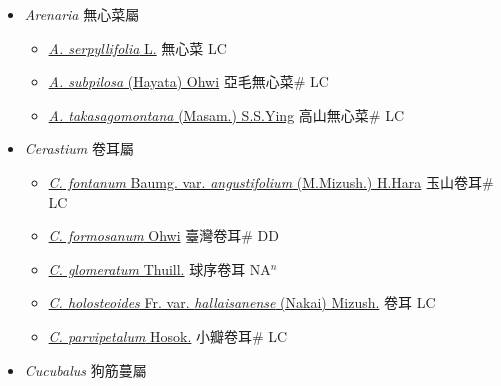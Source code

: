 
  \begin{itemize}
 \item[] \textit{Arenaria} 無心菜屬
                    
  \begin{itemize}
        \item[] \href{http://www.theplantlist.org/tpl1.1/search?q=Arenaria+serpyllifolia}{\textit{A. serpyllifolia} L.}   無心菜 LC
        \item[] \href{http://www.theplantlist.org/tpl1.1/search?q=Arenaria+subpilosa}{\textit{A. subpilosa} (Hayata) Ohwi}   亞毛無心菜\# LC
        \item[] \href{http://www.theplantlist.org/tpl1.1/search?q=Arenaria+takasagomontana}{\textit{A. takasagomontana} (Masam.) S.S.Ying}   高山無心菜\# LC
  \end{itemize}
 \item[] \textit{Cerastium} 卷耳屬
                    
  \begin{itemize}
        \item[] \href{http://www.theplantlist.org/tpl1.1/search?q=Cerastium+fontanum+var.+angustifolium}{\textit{C. fontanum} Baumg. var. \textit{angustifolium} (M.Mizush.) H.Hara}   玉山卷耳\# LC
        \item[] \href{http://www.theplantlist.org/tpl1.1/search?q=Cerastium+formosanum}{\textit{C. formosanum} Ohwi}   臺灣卷耳\# DD
        \item[] \href{http://www.theplantlist.org/tpl1.1/search?q=Cerastium+glomeratum}{\textit{C. glomeratum} Thuill.}   球序卷耳 NA$^n$
        \item[] \href{http://www.theplantlist.org/tpl1.1/search?q=Cerastium+holosteoides+var.+hallaisanense}{\textit{C. holosteoides} Fr. var. \textit{hallaisanense} (Nakai) Mizush.}   卷耳 LC
        \item[] \href{http://www.theplantlist.org/tpl1.1/search?q=Cerastium+parvipetalum}{\textit{C. parvipetalum} Hosok.}   小瓣卷耳\# LC
  \end{itemize}
 \item[] \textit{Cucubalus} 狗筋蔓屬
                    

\end{itemize}
